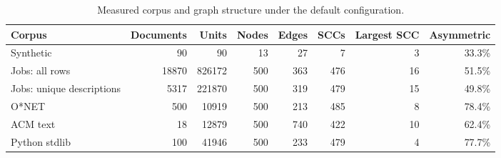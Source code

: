 \begin{table}[t]
  \caption{Measured corpus and graph structure under the default configuration.}
  \label{tab:corpus-overview}
  \centering
  \small
  \setlength{\tabcolsep}{1.2pt}
  \begin{tabular}{lrrrrrrr}
    \toprule
    Corpus & Documents & Units & Nodes & Edges & SCCs & Largest SCC & Asymmetric \\
    \midrule
    Synthetic & 90 & 90 & 13 & 27 & 7 & 3 & 33.3\% \\
    Jobs: all rows & 18870 & 826172 & 500 & 363 & 476 & 16 & 51.5\% \\
    Jobs: unique descriptions & 5317 & 221870 & 500 & 319 & 479 & 15 & 49.8\% \\
    O*NET & 500 & 10919 & 500 & 213 & 485 & 8 & 78.4\% \\
    ACM text & 18 & 12879 & 500 & 740 & 422 & 10 & 62.4\% \\
    Python stdlib & 100 & 41946 & 500 & 233 & 479 & 4 & 77.7\% \\
    \bottomrule
  \end{tabular}
\end{table}
